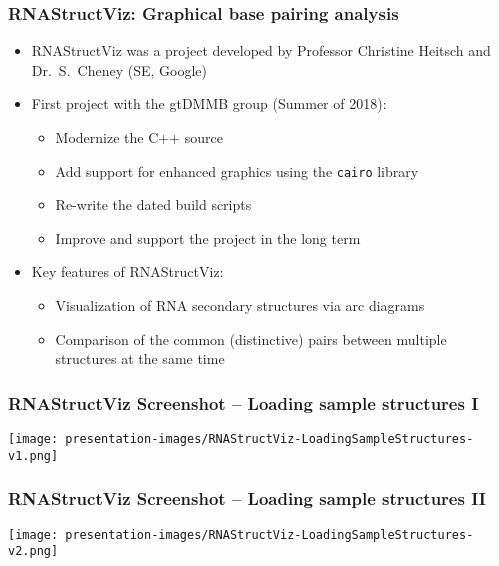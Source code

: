 \documentclass[usenames,svgnames,dvipsnames,11pt]{beamer}
\begin{document}
\begin{frame}
\frametitle{RNAStructViz: Graphical base pairing analysis}
\begin{itemize} 

\item RNAStructViz was a project developed by 
	Professor Christine Heitsch and Dr.~S.~Cheney (SE, Google)
\item First project with the gtDMMB group (Summer of 2018):
	\begin{itemize}
	\item Modernize the C++ source
        \item Add support for enhanced graphics using the \texttt{cairo} library
	\item Re-write the dated build scripts 
	\item Improve and support the project in the long term 
	\end{itemize}
\item Key features of RNAStructViz: 
	\begin{itemize}
	\item Visualization of RNA secondary structures via arc diagrams
	\item Comparison of the common (distinctive) pairs between 
	      multiple structures at the same time 
	\end{itemize}

\end{itemize}

\end{frame}

\begin{frame}[fragile]
\frametitle{RNAStructViz Screenshot -- Loading sample structures I}

\begin{center}
\texttt{[image: presentation-images/RNAStructViz-LoadingSampleStructures-v1.png]}
\end{center}

\end{frame}

\begin{frame}[fragile]
\frametitle{RNAStructViz Screenshot -- Loading sample structures II}

\begin{center}
\texttt{[image: presentation-images/RNAStructViz-LoadingSampleStructures-v2.png]}
\end{center}

\end{frame}
\end{document}
